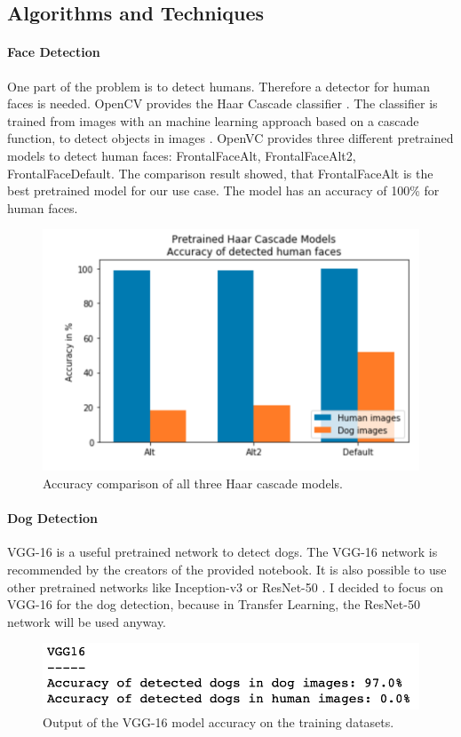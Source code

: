 \documentclass{article}
\begin{document}
\subsection{Algorithms and Techniques} \label{su_alg_and_techn}
\paragraph{Face Detection} One part of the problem is to detect humans. Therefore a detector for human faces is needed. OpenCV provides the Haar Cascade classifier \cite{haar_cascade}. The classifier is trained from images with an machine learning approach based on a cascade function, to detect objects in images \cite{opencv}. OpenVC provides three different pretrained models to detect human faces: \textsf{FrontalFaceAlt}, \textsf{FrontalFaceAlt2}, \textsf{FrontalFaceDefault}. The comparison result showed, that \textsf{FrontalFaceAlt} is the best pretrained model for our use case. The model has an accuracy of 100\% for human faces.
\begin{figure}[h]
    \centering
    \includegraphics[scale=0.45]{./images/haar_cascades_results}
    \caption{Accuracy comparison of all three Haar cascade models.}
    \label{fig:haar_cascace_comp}
\end{figure}

\paragraph{Dog Detection} VGG-16 \cite{vgg} is a useful pretrained network to detect dogs. The VGG-16 network is recommended by the creators of the provided notebook. It is also possible to use other pretrained networks like Inception-v3 or ResNet-50 \cite{resnet}. I decided to focus on VGG-16 for the dog detection, because in Transfer Learning, the ResNet-50 network will be used anyway.
\begin{figure}[h]
    \centering
    \includegraphics[scale=0.45]{./images/vgg16_dog_detector}
    \caption{Output of the VGG-16 model accuracy on the training datasets.}
    \label{fig:dog_detection_acc}
\end{figure}
\end{document}
